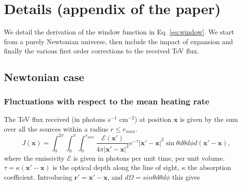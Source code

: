 \documentclass[onecolumn]{emulateapj}
\begin{document}


 \section{Details (appendix of the paper)}
We detail the derivation of the window function in Eq. \ref{eq:window}. We start from a purely Newtonian universe, then include the impact of expansion and finally the various first order corrections to the received TeV flux.
\subsection {Newtonian case}\label{sec:windon_newt}

\subsubsection {Fluctuations with respect to the mean heating rate}

The TeV flux received (in photons s$^{-1}$ cm$^{-2}$) at position $\mathbf{x}$ is given by the sum over all the sources within a radius $r\leqslant r_{max}$.
\begin{equation}
  \label{eq:flux_recu0}
  J(\mathbf{x})=\int_{0}^{2\pi}\int_{0}^{\pi}\int_0^{r_{max}}   \frac{\mathcal{E}(\mathbf{x}') }{4\pi |\mathbf{x}'-\mathbf{x}|^2} e^{-\tau} |\mathbf{x}'-\mathbf{x}|^2 \sin\theta d\theta d\phi d(\mathbf{x}'-\mathbf{x}),
\end{equation}
where the emissivity $\mathcal{E}$ is given in photons per unit time, per unit volume. $\tau=\kappa (\mathbf{x}'-\mathbf{x})$ is the optical depth along the line of sight, $\kappa$ the absorption coefficient.
Introducing $\mathbf{r'}=\mathbf{x}'-\mathbf{x}$, and $d\Omega=sin\theta d\theta d\phi$ this gives
\end{document}
